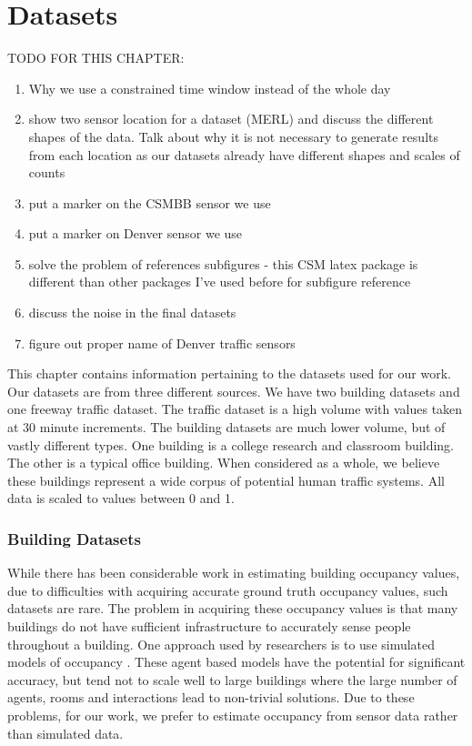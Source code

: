 \chapter{Datasets}

TODO FOR THIS CHAPTER:
\begin{enumerate}
	\item Why we use a constrained time window instead of the whole day
	\item show two sensor location for a dataset (MERL) and discuss the different shapes of the data.  Talk about why it is not necessary to generate results from each location as our datasets already have different shapes and scales of counts
	\item put a marker on the CSMBB sensor we use
	\item put a marker on Denver sensor we use
	\item solve the problem of references subfigures - this CSM latex package is different than other packages I've used before for subfigure reference
	\item discuss the noise in the final datasets
	\item figure out proper name of Denver traffic sensors
\end{enumerate}

This chapter contains information pertaining to the datasets used for our work.  Our datasets are from three different sources.  We have two building datasets and one freeway traffic dataset.  The traffic dataset is a high volume with values taken at 30 minute increments.  The building datasets are much lower volume, but of vastly different types.  One building is a college research and classroom building.  The other is a typical office building.  When considered as a whole, we believe these buildings represent a wide corpus of potential human traffic systems.  All data is scaled to values between 0 and 1.  

\subsection{Building Datasets}
While there has been considerable work in estimating building occupancy values, due to difficulties with acquiring accurate ground truth occupancy values, such datasets are rare.  The problem in acquiring these occupancy values is that many buildings do not have sufficient infrastructure to accurately sense people throughout a building.  One approach used by researchers is to use simulated models of occupancy \cite{page2008, goldstein2010}.  These agent based models have the potential for significant accuracy, but tend not to scale well to large buildings where the large number of agents, rooms and interactions lead to non-trivial solutions.  Due to these problems, for our work, we prefer to estimate occupancy from sensor data rather than simulated data.

